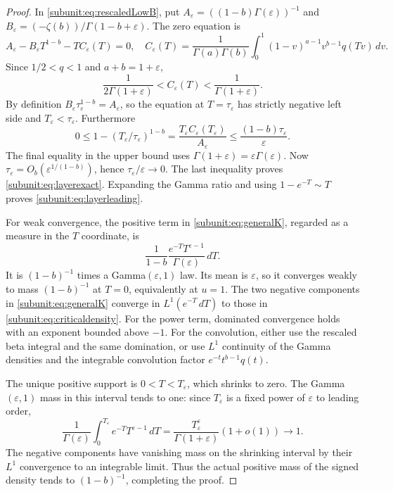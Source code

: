 \begin{proof}
In \eqref{subunit:eq:rescaledLowB}, put
$A_\varepsilon=((1-b)\Gamma(\varepsilon))^{-1}$ and
$B_\varepsilon=(-\zeta(b))/\Gamma(1-b+\varepsilon)$.
The zero equation is
\[
 A_\varepsilon-B_\varepsilon T^{1-b}-T C_\varepsilon(T)=0,
 \quad
 C_\varepsilon(T)=\frac1{\Gamma(a)\Gamma(b)}
 \int_0^1(1-v)^{a-1}v^{b-1}q(Tv)\,dv.
\]
Since $1/2<q<1$ and $a+b=1+\varepsilon$,
\[
 \frac1{2\Gamma(1+\varepsilon)}
 <C_\varepsilon(T)<\frac1{\Gamma(1+\varepsilon)}.
\]
By definition $B_\varepsilon\tau_\varepsilon^{1-b}
=A_\varepsilon$, so the equation at $T=\tau_\varepsilon$ has
strictly negative left side and $T_\varepsilon<\tau_\varepsilon$.
Furthermore
\[
 0\leq1-(T_\varepsilon/\tau_\varepsilon)^{1-b}
 =\frac{T_\varepsilon C_\varepsilon(T_\varepsilon)}
       {A_\varepsilon}
 \leq\frac{(1-b)\tau_\varepsilon}{\varepsilon}.
\]
The final equality in the upper bound uses
$\Gamma(1+\varepsilon)=\varepsilon\Gamma(\varepsilon)$.
Now $\tau_\varepsilon=O_b(\varepsilon^{1/(1-b)})$, hence
$\tau_\varepsilon/\varepsilon\to0$. The last inequality proves
\eqref{subunit:eq:layerexact}. Expanding the Gamma ratio and using
$1-e^{-T}\sim T$ proves \eqref{subunit:eq:layerleading}.

For weak convergence, the positive term in
\eqref{subunit:eq:generalK}, regarded as a measure in the $T$
coordinate, is
\[
 \frac1{1-b}\frac{e^{-T}T^{\varepsilon-1}}
 {\Gamma(\varepsilon)}\,dT.
\]
It is $(1-b)^{-1}$ times a Gamma$(\varepsilon,1)$ law. Its mean
is $\varepsilon$, so it converges weakly to mass $(1-b)^{-1}$
at $T=0$, equivalently at $u=1$. The two negative components in
\eqref{subunit:eq:generalK} converge in $L^1(e^{-T}\,dT)$ to
those in \eqref{subunit:eq:criticaldensity}. For the power term,
dominated convergence holds with an exponent bounded above $-1$.
For the convolution, either use the rescaled beta integral and the
same domination, or use $L^1$ continuity of the Gamma densities and
the integrable convolution factor $e^{-t}t^{b-1}q(t)$.

The unique positive support is $0<T<T_\varepsilon$, which shrinks
to zero. The Gamma$(\varepsilon,1)$ mass in this interval tends to
one: since $T_\varepsilon$ is a fixed power of $\varepsilon$ to
leading order,
\[
 \frac1{\Gamma(\varepsilon)}\int_0^{T_\varepsilon}
 e^{-T}T^{\varepsilon-1}\,dT
 =\frac{T_\varepsilon^\varepsilon}{\Gamma(1+\varepsilon)}(1+o(1))
 \longrightarrow1.
\]
The negative components have vanishing mass on the shrinking interval
by their $L^1$ convergence to an integrable limit. Thus the actual
positive mass of the signed density tends to $(1-b)^{-1}$, completing
the proof.
\end{proof}


